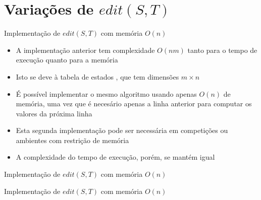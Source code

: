 \section{Variações de $edit(S, T)$}

\begin{frame}[fragile]{Implementação de $edit(S, T)$ com memória $O(n)$}

    \begin{itemize}
        \item A implementação anterior tem complexidade $O(nm)$ tanto para o tempo de execução
            quanto para a memória
        \pause

        \item Isto se deve à tabela de estados , que tem dimensões $m \times n$
        \pause

        \item  É possível implementar o mesmo algoritmo usando apenas $O(n)$ de memória, uma vez 
            que é necesário apenas a linha anterior para computar os valores da próxima linha
        \pause

        \item Esta segunda implementação pode ser necessária em competições ou ambientes com 
            restrição de memória
        \pause

        \item A complexidade do tempo de execução, porém, se mantém igual

    \end{itemize}

\end{frame}

\begin{frame}[fragile]{Implementação de $edit(S, T)$ com memória $O(n)$}
\end{frame}

\begin{frame}[fragile]{Implementação de $edit(S, T)$ com memória $O(n)$}
\end{frame}

